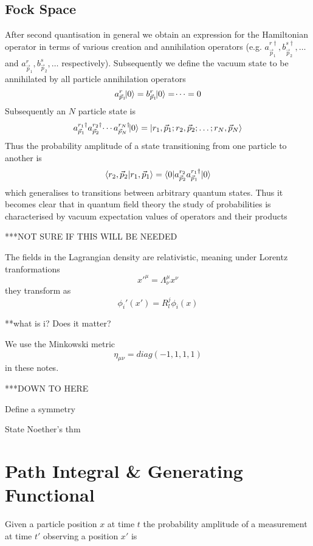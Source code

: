 \documentclass[11pt, a4paper]{article}
\theoremstyle{definition}
\theoremstyle{plain}
\begin{document}
\subsection{Fock Space}
After second quantisation in general we obtain an expression for the Hamiltonian operator
in terms of various creation and annihilation operators (e.g. $a^{r\dagger}_{\vec{p}_1},
b^{s\dagger}_{\vec{p}_2}, \dots$ and $a^{r}_{\vec{p}_1}, b^{s}_{\vec{p}_2}, \dots$ 
respectively). Subsequently we define the vacuum state to be annihilated by
all particle annihilation operators
\begin{equation}
  {a^{r}_{\vec{p}_1}}\!\!\ket{0} = b^{r}_{\vec{p}_1}\!\!\ket{0} = \dotsi = 0
\end{equation}
Subsequently an $N$ particle state is
\begin{equation}
  a^{r_1\dagger}_{\vec{p}_1}a^{r_2\dagger}_{\vec{p}_2}\dotsi
  a^{r_N\dagger}_{\vec{p}_N}\!\!\ket{0} =
  \ket{r_1, \vec{p}_1; r_2, \vec{p}_2; \dots; r_N, \vec{p}_N}
\end{equation}
Thus the probability amplitude of a state transitioning from one particle to 
another is
\begin{equation}
  \braket{r_2, \vec{p}_2|r_1, \vec{p}_1} =
  \braket{0|a^{r_2}_{\vec{p}_2}a^{r_1\dagger}_{\vec{p}_1}|0}
\end{equation}
which generalises to transitions between arbitrary quantum states.
Thus it becomes clear that in quantum field theory the study of probabilities is
characterised by vacuum expectation values of operators and their products

\newpage








***NOT SURE IF THIS WILL BE NEEDED


The fields in the Lagrangian density are relativistic, 
meaning under Lorentz tranformations
\[ x'^{\mu} = \Lambda^{\mu}_{\nu} x^{\nu} \]
they transform as 
\[ \phi_i'(x') = R_l^j \phi_i(x) \]

**what is i? Does it matter?

We use the Minkowski metric 
\[ \eta_{\mu \nu} = diag(-1,1,1,1) \]
in these notes.

***DOWN TO HERE 

Define a symmetry

State Noether's thm



\section{Path Integral \& Generating Functional}
Given a particle position $x$ at time $t$ the probability amplitude of
a measurement at time $t'$ observing a position $x'$ is
\end{document}
